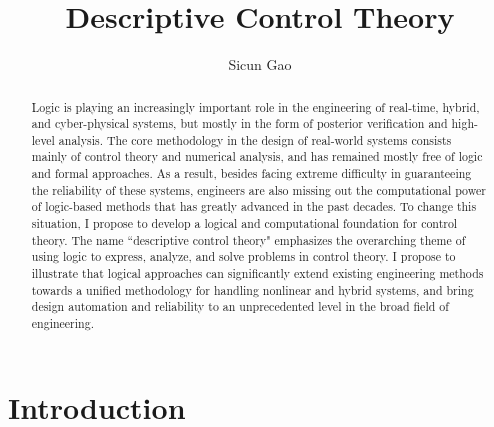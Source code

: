 \documentclass[10pt]{article}
\title{\bf Descriptive Control Theory}
\author{Sicun Gao}
\date{}
\theoremstyle{definition}
\begin{document}
\maketitle
\thispagestyle{empty}
\begin{abstract}
Logic is playing an increasingly important role in the engineering of real-time, hybrid, and cyber-physical systems, but mostly in the form of posterior verification and high-level analysis. The core methodology in the design of real-world systems consists mainly of control theory and numerical analysis, and has remained mostly free of logic and formal approaches. As a result, besides facing extreme difficulty in guaranteeing the reliability of these systems, engineers are also missing out the computational power of logic-based methods that has greatly advanced in the past decades. To change this situation, I propose to develop a logical and computational foundation for control theory. The name ``descriptive control theory" emphasizes the overarching theme of using logic to express, analyze, and solve problems in control theory. I propose to illustrate that logical approaches can significantly extend existing engineering methods towards a unified methodology for handling nonlinear and hybrid systems, and bring design automation and reliability to an unprecedented level in the broad field of engineering. 
\end{abstract}

\vspace{.6cm}

\section{Introduction}
\end{document}
